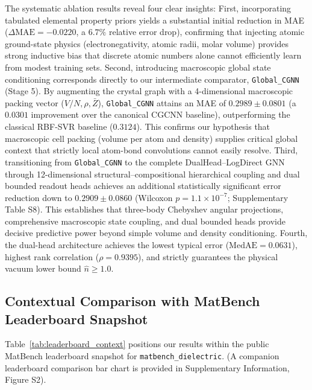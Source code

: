 \documentclass[journal,article,submit,moreauthors,pdftex]{article}
\begin{document}
The systematic ablation results reveal four clear insights:
First, incorporating tabulated elemental property priors yields a substantial initial reduction in MAE ($\Delta\mathrm{MAE} = -0.0220$, a $6.7\%$ relative error drop), confirming that injecting atomic ground-state physics (electronegativity, atomic radii, molar volume) provides strong inductive bias that discrete atomic numbers alone cannot efficiently learn from modest training sets.
Second, introducing macroscopic global state conditioning corresponds directly to our intermediate comparator, \texttt{Global\_CGNN} (Stage 5). By augmenting the crystal graph with a 4-dimensional macroscopic packing vector ($V/N, \rho, \bar{Z}$), \texttt{Global\_CGNN} attains an MAE of $0.2989 \pm 0.0801$ (a $0.0301$ improvement over the canonical CGCNN baseline), outperforming the classical RBF-SVR baseline ($0.3124$). This confirms our hypothesis that macroscopic cell packing (volume per atom and density) supplies critical global context that strictly local atom-bond convolutions cannot easily resolve.
Third, transitioning from \texttt{Global\_CGNN} to the complete DualHead--LogDirect GNN through 12-dimensional structural--compositional hierarchical coupling and dual bounded readout heads achieves an additional statistically significant error reduction down to $0.2909 \pm 0.0860$ (Wilcoxon $p = 1.1 \times 10^{-7}$; Supplementary Table S8). This establishes that three-body Chebyshev angular projections, comprehensive macroscopic state coupling, and dual bounded heads provide decisive predictive power beyond simple volume and density conditioning.
Fourth, the dual-head architecture achieves the lowest typical error ($\mathrm{MedAE} = 0.0631$), highest rank correlation ($\rho = 0.9395$), and strictly guarantees the physical vacuum lower bound $\hat{n} \ge 1.0$.

\subsection{Contextual Comparison with MatBench Leaderboard Snapshot}
Table~\ref{tab:leaderboard_context} positions our results within the public MatBench leaderboard snapshot for \texttt{matbench\_dielectric}. (A companion leaderboard comparison bar chart is provided in Supplementary Information, Figure S2).
\end{document}
